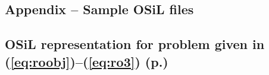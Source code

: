 \documentclass[11pt]{article}
\renewcommand{\_}{{\char"5F}}
\renewcommand{\{}{{\char"7B}}
\renewcommand{\}}{{\char"7D}}
\renewcommand{\^}{{\char"0D}}
\renewcommand{\'}{{\char"0D}}
\begin{document}
\begin{enumerate}[Step 1:]

\section{Appendix -- Sample OSiL files}\label{section:appendix}

\subsection{OSiL representation for problem given in (\ref{eq:roobj})--(\ref{eq:ro3}) (p.\pageref{eq:roobj})}\label{section:rosenbrockXML}



\end{enumerate}
\end{document}
